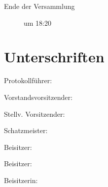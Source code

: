 \documentclass[a4paper,12pt]{scrartcl}
\begin{document}
\begin{description}
  \item[Ende der Versammlung] um 18:20
\end{description}

\cleardoublepage
\section*{Unterschriften}
\vspace{0.7cm}
\noindent Protokollführer: \hrulefill\hfill\phantom{c}\par
\vspace{0.7cm}
\noindent Vorstandsvorsitzender: \hrulefill\hfill\phantom{c}\par
\vspace{0.7cm}
\noindent Stellv. Vorsitzender: \hrulefill\hfill\phantom{c}\par
\vspace{0.7cm}
\noindent Schatzmeister: \hrulefill\hfill\phantom{c}\par
\vspace{0.7cm}
\noindent Beisitzer: \hrulefill\hfill\phantom{c}\par
\vspace{0.7cm}
\noindent Beisitzer: \hrulefill\hfill\phantom{c}\par
\vspace{0.7cm}
\noindent Beisitzerin: \hrulefill\hfill\phantom{c}\par
\end{document}
